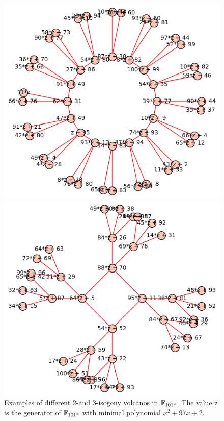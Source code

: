 \begin{figure}
\begin{minipage}{0.5\textwidth}
    \end{minipage}
    \begin{minipage}{0.5\textwidth}
        \includegraphics[width = \textwidth]{../example_II.png}
    \end{minipage}%
    \begin{minipage}{0.5\textwidth}
        \includegraphics[width = \textwidth]{../example_III.png}
    \end{minipage}
    \caption{
        \label{fig:example_vulcanos} Examples of different 2-and 3-isogeny volcanos in $\mathbb{F}_{101^2}$. 
        The value $\mathrm{z}$ is the generator of $\mathbb{F}_{101^2}$ with minimal polynomial $x^2 + 97x + 2$.
    }
\end{figure}

